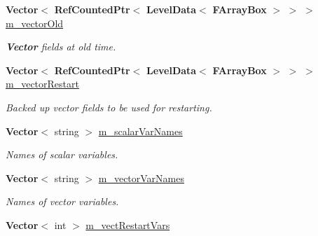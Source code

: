 \begin{DoxyCompactItemize}
\mbox{\label{class_a_m_r_level_mushy_layer_a3462ba31ff9fc2ea54892d9f0c9ee88b}} 
\textbf{ Vector}$<$ \textbf{ Ref\+Counted\+Ptr}$<$ \textbf{ Level\+Data}$<$ \textbf{ F\+Array\+Box} $>$ $>$ $>$ \hyperlink{class_a_m_r_level_mushy_layer_a3462ba31ff9fc2ea54892d9f0c9ee88b}{m\+\_\+vector\+Old}
\begin{DoxyCompactList}\small\item\em \textbf{ Vector} fields at old time. \end{DoxyCompactList}\item 
\mbox{\label{class_a_m_r_level_mushy_layer_a728c07f2d1ab13e5e30f511f579786d1}} 
\textbf{ Vector}$<$ \textbf{ Ref\+Counted\+Ptr}$<$ \textbf{ Level\+Data}$<$ \textbf{ F\+Array\+Box} $>$ $>$ $>$ \hyperlink{class_a_m_r_level_mushy_layer_a728c07f2d1ab13e5e30f511f579786d1}{m\+\_\+vector\+Restart}
\begin{DoxyCompactList}\small\item\em Backed up vector fields to be used for restarting. \end{DoxyCompactList}\item 
\mbox{\label{class_a_m_r_level_mushy_layer_ade5e5c646cf12ebaacd01f0a3ba137d9}} 
\textbf{ Vector}$<$ string $>$ \hyperlink{class_a_m_r_level_mushy_layer_ade5e5c646cf12ebaacd01f0a3ba137d9}{m\+\_\+scalar\+Var\+Names}
\begin{DoxyCompactList}\small\item\em Names of scalar variables. \end{DoxyCompactList}\item 
\mbox{\label{class_a_m_r_level_mushy_layer_a6f408f55473cdc50d4f5fa9c8cc5649b}} 
\textbf{ Vector}$<$ string $>$ \hyperlink{class_a_m_r_level_mushy_layer_a6f408f55473cdc50d4f5fa9c8cc5649b}{m\+\_\+vector\+Var\+Names}
\begin{DoxyCompactList}\small\item\em Names of vector variables. \end{DoxyCompactList}\item 
\mbox{\label{class_a_m_r_level_mushy_layer_ae0f3b5fdacca3dfa15f5b81bc2c8a9bb}} 
\textbf{ Vector}$<$ int $>$ \hyperlink{class_a_m_r_level_mushy_layer_ae0f3b5fdacca3dfa15f5b81bc2c8a9bb}{m\+\_\+vect\+Restart\+Vars}

\end{DoxyCompactItemize}
